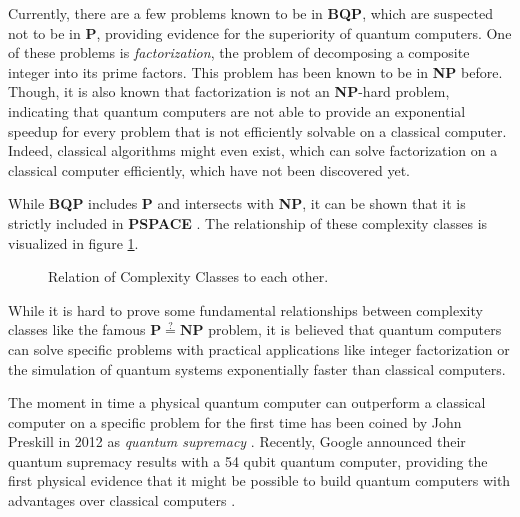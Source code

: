 Currently, there are a few problems known to be in \textbf{BQP}, which are suspected not to be in \textbf{P}, providing evidence for the superiority of quantum computers. One
of these problems is \textit{factorization}, the problem of decomposing a
composite integer into its prime factors. This problem has been known to be in
\textbf{NP} before. Though, it is also known that factorization is not an \textbf{NP}-hard problem, indicating that quantum computers are not able to provide
an exponential speedup for every problem that is not efficiently solvable on a
classical computer. Indeed, classical algorithms might even exist, which can
solve factorization on a classical computer efficiently, which have not been
discovered yet.

While \textbf{BQP} includes \textbf{P} and intersects with \textbf{NP}, it can be shown that it is strictly
included in \textbf{PSPACE} \cite{Bernstein93quantumcomplexity}. The relationship of these complexity classes is visualized
in figure \ref{fig:complexityclasses}.

\begin{figure}[H]
  \centering
  \caption[Relation of Complexity Classes to each other]{Relation of Complexity Classes to each other.}
  \label{fig:complexityclasses}
\end{figure}

While it is hard to prove some fundamental relationships between complexity
classes like the famous $\mathbf{P} \stackrel{?}{=} \mathbf{NP}$ problem, it is believed that quantum computers
can solve specific problems with practical applications like integer factorization \cite{shor1997factorisation} or the simulation of
quantum systems \cite{feynman1982simulating} exponentially faster than classical computers.

The moment
in time a physical quantum computer can outperform a classical computer
on a specific problem for the first time has been coined by John Preskill in
2012 as \textit{quantum supremacy} \cite{preskill2012quantum}. Recently, Google announced their quantum
supremacy results with a 54 qubit quantum computer, providing the first physical evidence that it
might be possible to build quantum computers with advantages over classical
computers \cite{martines2019supremacy}.